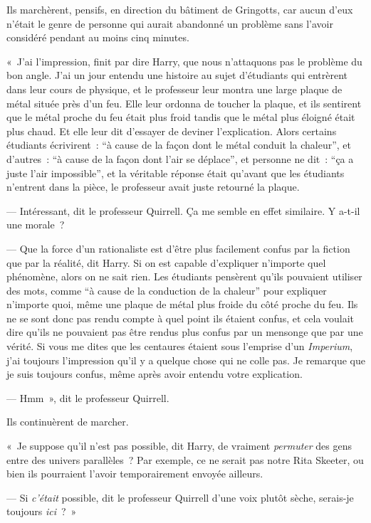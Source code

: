 Ils marchèrent, pensifs, en direction du bâtiment de Gringotts, car aucun d'eux n'était le genre de personne qui aurait abandonné un problème sans l'avoir considéré pendant au moins cinq minutes.

«~J'ai l'impression, finit par dire Harry, que nous n'attaquons pas le problème du bon angle. J'ai un jour entendu une histoire au sujet d'étudiants qui entrèrent dans leur cours de physique, et le professeur leur montra une large plaque de métal située près d'un feu. Elle leur ordonna de toucher la plaque, et ils sentirent que le métal proche du feu était plus froid tandis que le métal plus éloigné était plus chaud. Et elle leur dit d'essayer de deviner l'explication. Alors certains étudiants écrivirent~: “à cause de la façon dont le métal conduit la chaleur”, et d'autres~: “à cause de la façon dont l'air se déplace”, et personne ne dit~: “ça a juste l'air impossible”, et la véritable réponse était qu'avant que les étudiants n'entrent dans la pièce, le professeur avait juste retourné la plaque.

--- Intéressant, dit le professeur Quirrell. Ça me semble en effet similaire. Y a-t-il une morale~?

--- Que la force d'un rationaliste est d'être plus facilement confus par la fiction que par la réalité, dit Harry. Si on est capable d'expliquer n'importe quel phénomène, alors on ne sait rien. Les étudiants pensèrent qu'ils pouvaient utiliser des mots, comme “à cause de la conduction de la chaleur” pour expliquer n'importe quoi, même une plaque de métal plus froide du côté proche du feu. Ils ne se sont donc pas rendu compte à quel point ils étaient confus, et cela voulait dire qu'ils ne pouvaient pas être rendus plus confus par un mensonge que par une vérité. Si vous me dites que les centaures étaient sous l'emprise d'un \emph{Imperium}, j'ai toujours l'impression qu'il y a quelque chose qui ne colle pas. Je remarque que je suis toujours confus, même après avoir entendu votre explication.

--- Hmm~», dit le professeur Quirrell.

Ils continuèrent de marcher.

«~Je suppose qu'il n'est pas possible, dit Harry, de vraiment \emph{permuter} des gens entre des univers parallèles~? Par exemple, ce ne serait pas notre Rita Skeeter, ou bien ils pourraient l'avoir temporairement envoyée ailleurs.

--- Si \emph{c'était} possible, dit le professeur Quirrell d'une voix plutôt sèche, serais-je toujours \emph{ici}~?~»

